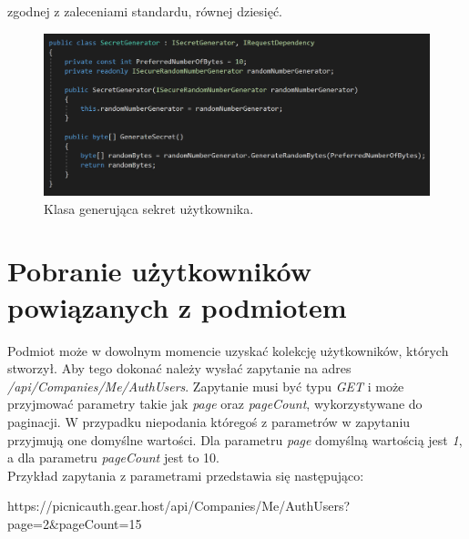 zgodnej z zaleceniami standardu, równej dziesięć.
\begin{figure}[t]
    \centering
	\includegraphics[width=\textwidth]{content/images/code-secretgenerator}
    \caption{Klasa generująca sekret użytkownika.}
    \label{code-secretgenerator}
\end{figure}

\section{Pobranie użytkowników powiązanych z podmiotem}
Podmiot może w dowolnym momencie uzyskać kolekcję użytkowników, których stworzył. 
Aby tego dokonać należy wysłać zapytanie na adres \textit{/api/Companies/Me/AuthUsers}. 
Zapytanie musi być typu \textit{GET} i może przyjmować parametry takie jak \textit{page} oraz \textit{pageCount}, 
wykorzystywane do paginacji. 
W przypadku niepodania któregoś z parametrów w zapytaniu przyjmują one domyślne wartości. 
Dla parametru \textit{page} domyślną wartością jest \textit{1}, a dla parametru \textit{pageCount} jest to 10. \\
Przykład zapytania z parametrami przedstawia się następująco: \\
\centerline{https://picnicauth.gear.host/api/Companies/Me/AuthUsers?page=2\&pageCount=15}

